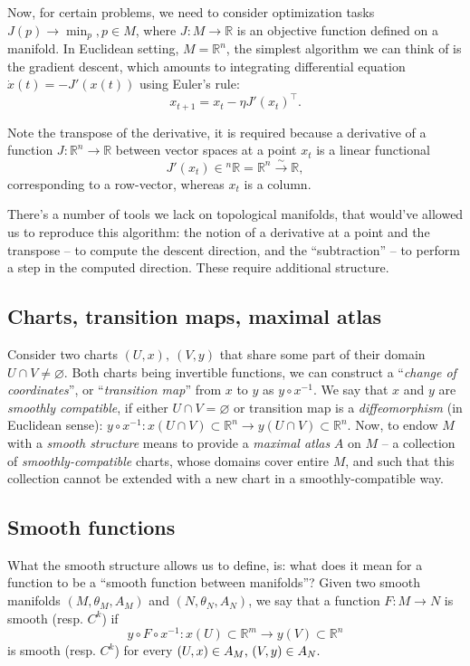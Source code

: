 Now, for certain problems, we need to consider optimization tasks \(
J(p)\to\min_p, p\in M \), where \( J: M\to \mathbb{R} \) is an objective
function defined on a manifold. In Euclidean setting, \( M = \mathbb{R}^n \),
the simplest algorithm we can think of is the gradient descent,
which amounts to integrating differential equation \( \dot x (t) = -J'(x(t)) \)
using Euler's rule:
\[
x_{t+1} = x_t - \eta J'(x_t)^\top. \]

Note the transpose of the derivative, it is required because a derivative of a
function \( J: \mathbb{R}^n\to\mathbb{R} \) between vector spaces at a point \(
x_t \) is a linear functional \[ J'(x_t) \in {^n}\mathbb{R} =
\mathbb{R}^n\xrightarrow{\sim}\mathbb{R}, \] corresponding to a row-vector, whereas \( x_t \)
is a column.

There's a number of tools we lack on topological manifolds, that would've
allowed us to reproduce this algorithm: the notion of a derivative at a point and
the transpose -- to compute the descent direction, and the ``subtraction'' --
to perform a step in the computed direction. These require additional structure.

\subsection*{Charts, transition maps, maximal atlas}

Consider two charts \( (U, x),~ (V, y) \) that share some part of their domain
\( U\cap V \neq \varnothing. \)
Both charts being invertible functions,
we can construct a ``\emph{change of coordinates}'', or ``\emph{transition map}''
from \(x\) to \(y\) as \(y\circ x^{-1}\). We say that \(x\) and \(y\)
are \emph{smoothly compatible}, if either \(U\cap V = \varnothing\)
or transition map is a \emph{diffeomorphism} (in Euclidean sense):
\(y\circ x^{-1}: x(U\cap V)\subset\mathbb{R}^n
\to y(U\cap V)\subset\mathbb{R}^n.\)
Now, to endow \(M\) with a \emph{smooth structure} means to provide
a \emph{maximal atlas} \(A\) on \(M\) -- a collection of \emph{smoothly-compatible}
charts, whose domains cover entire \(M\), and such that
this collection cannot be extended with a new chart in a smoothly-compatible way.

\subsection*{Smooth functions}
What the smooth structure allows us to define, is: what does it mean for a
function to be a ``smooth function between manifolds''?
Given two smooth manifolds \((M, \theta_M, A_M)\)
and \((N, \theta_N, A_N)\), we say that a function \(F: M\to N\)
is smooth (resp. \(C^k\)) if
\[y\circ F\circ x^{-1}: x(U)\subset\mathbb{R}^m \to y(V)\subset\mathbb{R}^n\]
is smooth (resp. \(C^k\))
for every \((U, x)\in A_M$, $(V, y) \in A_N.\)


